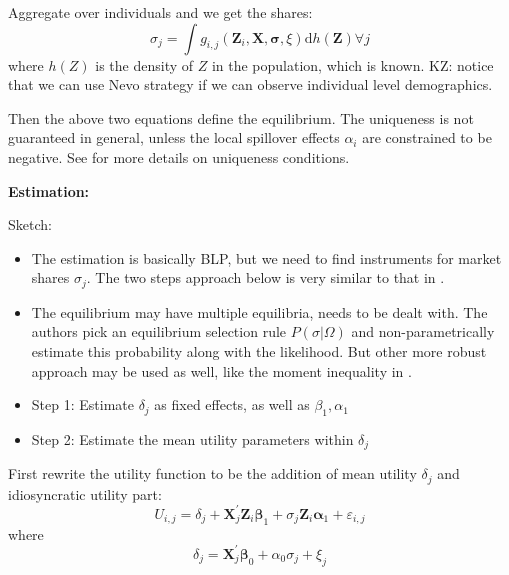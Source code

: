 Aggregate over individuals and we get the shares:
\[
    \sigma_{j}=\int g_{i, j}\left(\mathbf{Z}_{i}, \mathbf{X}, \boldsymbol{\sigma}, \xi\right) \mathrm{d} h(\boldsymbol{Z}) \forall j
\]
where $h(Z)$ is the density of $Z$ in the population, which is known. 
KZ: notice that we can use Nevo strategy if we can observe individual level demographics.

Then the above two equations define the equilibrium. 
The uniqueness is not guaranteed in general, unless the local spillover effects $\alpha_i$ are constrained to be negative.
See \textcite{BayerMcMillan2010} for more details on uniqueness conditions.

\textbf{Estimation:}

Sketch:
\begin{itemize}
    \item The estimation is basically BLP, but we need to find instruments for market shares $\sigma_j$. The two steps approach below is very similar to that in \citet{Hackmann2019}.
    \item The equilibrium may have multiple equilibria, needs to be dealt with. The authors pick an equilibrium selection rule $P(\sigma | \Omega)$ and non-parametrically estimate this probability along with the likelihood. But other more robust approach may be used as well, like the moment inequality in \citet{CilibertoTamer2009}.
    \item Step 1: Estimate $\delta_j$ as fixed effects, as well as $\beta_1, \alpha_1$
    \item Step 2: Estimate the mean utility parameters within $\delta_j$
\end{itemize}

First rewrite the utility function to be the addition of mean utility $\delta_j$ and idiosyncratic utility part:
\[
    U_{i, j}=\delta_{j}+\mathbf{X}_{j}^{\prime} \mathbf{Z}_{i} \boldsymbol{\beta}_{1}+\sigma_{j} \mathbf{Z}_{i} \boldsymbol{\alpha}_{1}+\varepsilon_{i, j}
\]
where
\[
    \delta_{j}=\mathbf{X}_{j}^{\prime} \boldsymbol{\beta}_{0}+\alpha_{0} \sigma_{j}+\xi_{j}
\]


